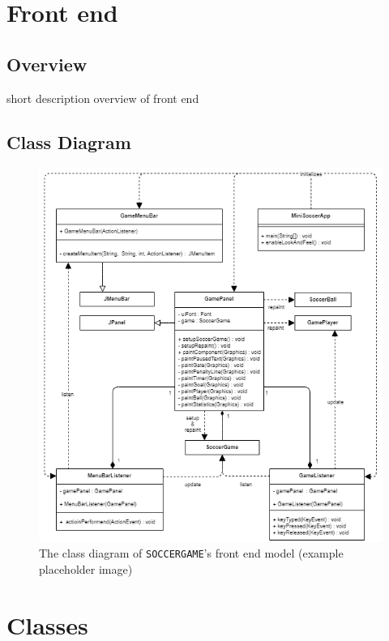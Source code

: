 \documentclass[12pt, dvipsnames, a4paper]{article}
\newcommand{\code}[1]{\texttt{#1}}
\begin{document}
\section{Front end}
\subsection{Overview}
short description overview of front end
\subsection{Class Diagram}
\begin{center}
	\begin{figure}[H]
		\hspace{50pt}
		\includegraphics[scale=0.6]{diagrams/class-diagrams/gui-model/gui-model-cd.png}
		\caption{The class diagram of \code{SOCCERGAME}'s front end model (example placeholder image)}
		\label{fig:frontend}
	\end{figure}
\end{center}
\clearpage

\section{Classes}
\end{document}
